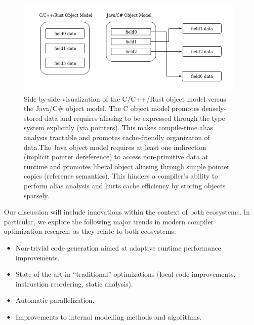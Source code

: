 \documentclass[nobib]{tufte-handout}
\begin{document}
\begin{figure}
\centering
\includegraphics[width=\linewidth]{images/SideBySideObjectModel.png}
\caption{Side-by-side visualization of the C/C++/Rust object model versus the Java/C\# object model.  The C object model promotes densely-stored data and requires aliasing to be expressed through the type system explicitly (via pointers).  This makes compile-time alias analysis tractable and promotes cache-friendly organizaton of data.\newline The Java object model requires at least one indirection (implicit pointer dereference) to access non-primitive data at runtime and promotes liberal object aliasing through simple pointer copies (reference semantics).  This hinders a compiler's ability to perform alias analysis and hurts cache efficiency by storing objects sparsely.}
\end{figure}



Our discussion will include innovations within the context of both ecosystems.  In particular, we explore the following major trends in modern compiler optimization research, as they relate to both ecosystems:
\begin{itemize}
\item Non-trivial code generation aimed at adaptive runtime performance improvements.
\item State-of-the-art in ``traditional'' optimizations (local code improvements, instruction reordering, static analysis).
\item Automatic parallelization.
\item Improvements to internal modelling methods and algorithms.
\end{itemize}



\end{document}
